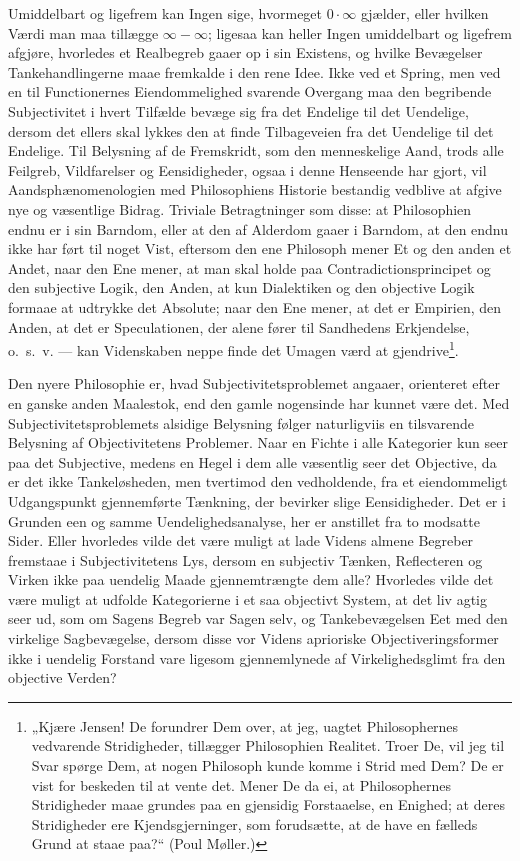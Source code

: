 \documentclass[12pt]{book}
\newcommand{\opage}[1]{\marginnote{\footnotesize\textit{[#1]}}}
\begin{document}
Umiddelbart og ligefrem kan Ingen sige, hvormeget $0 \cdot \infty$ gjælder, eller hvilken Værdi man
maa tillægge $\infty - \infty$; ligesaa kan heller Ingen umiddelbart og ligefrem afgjøre,
hvorledes et Realbegreb gaaer op i sin Existens, og hvilke Bevægelser Tankehandlingerne maae
fremkalde i den rene Idee. Ikke ved et Spring, men ved en til Functionernes Eiendommelighed
svarende Overgang maa den begribende Subjectivitet i hvert Tilfælde bevæge sig fra det Endelige til
det Uendelige, dersom det ellers skal lykkes den at finde Tilbageveien fra det Uendelige til det
Endelige. Til Belysning af de Fremskridt, som den menneskelige Aand, trods alle Feilgreb,
Vildfarelser og Eensidigheder, ogsaa i denne Henseende har gjort, vil Aandsphænomenologien med
Philosophiens Historie bestandig vedblive at afgive nye og væsentlige Bidrag. Triviale
Betragtninger som disse: at Philosophien endnu er
\opage{231} i sin Barndom, eller at den af Alderdom gaaer i Barndom, at den endnu ikke har ført til noget Vist,
eftersom den ene Philosoph mener Et og den anden et Andet, naar den Ene mener, at man skal holde
paa Contradictionsprincipet og den subjective Logik, den Anden, at kun Dialektiken og den objective
Logik formaae at udtrykke det Absolute; naar den Ene mener, at det er Empirien, den Anden, at det er
Speculationen, der alene fører til Sandhedens Erkjendelse, o.\ s.\ v. --- kan Videnskaben neppe
finde det Umagen værd at gjendrive\footnote{„Kjære Jensen! De forundrer Dem over, at jeg, uagtet
Philosophernes vedvarende Stridigheder, tillægger Philosophien Realitet. Troer De, vil jeg til Svar
spørge Dem, at nogen Philosoph kunde komme i Strid med Dem? De er vist for beskeden til at vente
det. Mener De da ei, at Philosophernes Stridigheder maae grundes paa en gjensidig Forstaaelse, en
Enighed; at deres Stridigheder ere Kjendsgjerninger, som forudsætte, at de have en fælleds Grund at
staae paa?“ (Poul Møller.)}.

Den nyere Philosophie er, hvad Subjectivitetsproblemet angaaer, orienteret efter en ganske anden
Maalestok, end den gamle nogensinde har kunnet være det. Med Subjectivitetsproblemets alsidige
Belysning følger naturligviis en tilsvarende Belysning af Objectivitetens Problemer. Naar en Fichte
i alle Kategorier kun seer paa det Subjective, medens en Hegel i dem alle væsentlig seer det
Objective, da er det ikke Tankeløsheden, men tvertimod den vedholdende, fra et eiendommeligt
Udgangspunkt gjennemførte Tænkning, der bevirker slige Eensidigheder. Det er i Grunden een og samme
Uendelighedsanalyse, her er anstillet fra to modsatte Sider. Eller hvorledes vilde det være muligt
at lade Videns almene Begreber fremstaae i Subjectivitetens Lys, dersom en subjectiv Tænken,
Reflecteren og Virken ikke paa uendelig Maade gjennemtrængte dem alle? Hvorledes vilde det være
muligt at udfolde Kategorierne i et saa objectivt System, at det liv%
\opage{232} agtig seer ud, som om Sagens Begreb var Sagen selv, og Tankebevægelsen Eet med den virkelige
Sagbevægelse, dersom disse vor Videns aprioriske Objectiveringsformer ikke i uendelig Forstand vare
ligesom gjennemlynede af Virkelighedsglimt fra den objective Verden?
\end{document}

